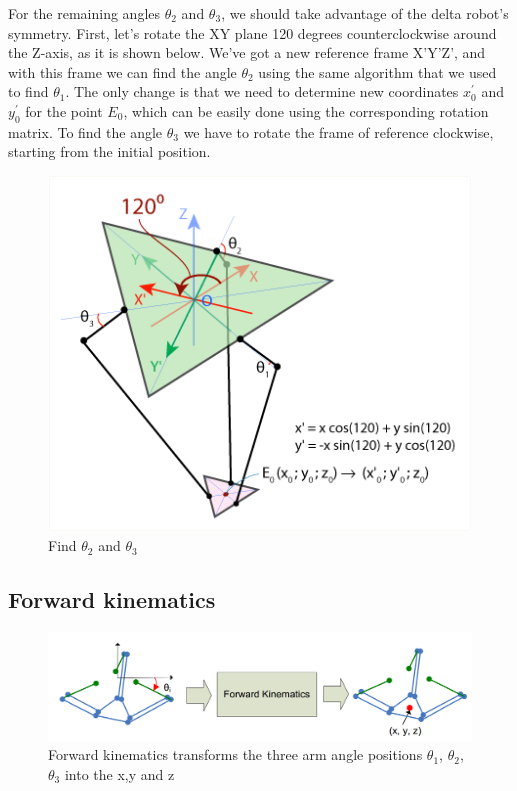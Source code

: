 For the remaining angles $\theta_{2}$ and $\theta_{3}$, we should take advantage of the delta robot's symmetry. First, let's rotate the XY plane 120 degrees counterclockwise around the Z-axis, as it is shown below. 
We've got a new reference frame X'Y'Z', and with this frame we can find the angle $\theta_{2}$ using the same algorithm that we used to find $\theta_{1}$. The only change is that we need to determine new coordinates $x^{'}_{0}$ and $y^{'}_{0}$ for the point $E_{0}$, which can be easily done using the corresponding rotation matrix. To find the angle $\theta_{3}$ we have to rotate the frame of reference clockwise, starting from the initial position.
\begin{figure}[H]
	\centering
	\includegraphics[width=\maxwidth{10cm}, keepaspectratio]{Chapters/Fig/find_theta2_and_theta3.png}
	\caption{Find $\theta_{2}$ and $\theta_{3}$}
	\label{fig:find_theta2_and_theta3}
\end{figure}

\subsection{Forward kinematics}
\begin{figure}[H]
	\centering
	\includegraphics[width=\maxwidth{15cm}, keepaspectratio]{Chapters/Fig/forward_kinematics.png}
	\caption{Forward kinematics transforms the three arm angle positions $\theta_{1}$, $\theta_{2}$, $\theta_{3}$ into the x,y and z}
	\label{fig:forward_kinematics}
\end{figure}
